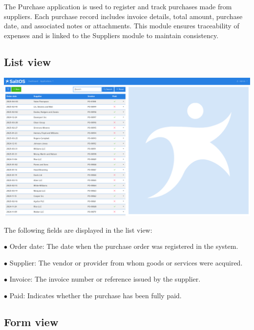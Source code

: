 \documentclass[a4paper]{article}
\begin{document}
The Purchase application is used to register and track purchases made from suppliers.
Each purchase record includes invoice details, total amount, purchase date, and associated notes or attachments.
This module ensures traceability of expenses and is linked to the Suppliers module to maintain consistency.

\hypertarget{toc118}{}
\subsection{List view}

\begin{center}\includegraphics[width=1\textwidth]{../ujest/snaps/test-screenshots-js-screenshots-purchases-purchase-list-en-us-1-snap.png}\end{center}

The following fields are displayed in the list view:

\begin{compactitem}
\item[\color{myblue}$\bullet$] Order date: The date when the purchase order was registered in the system.
\item[\color{myblue}$\bullet$] Supplier: The vendor or provider from whom goods or services were acquired.
\item[\color{myblue}$\bullet$] Invoice: The invoice number or reference issued by the supplier.
\item[\color{myblue}$\bullet$] Paid: Indicates whether the purchase has been fully paid.
\end{compactitem}

\hypertarget{toc119}{}
\subsection{Form view}
\end{document}
